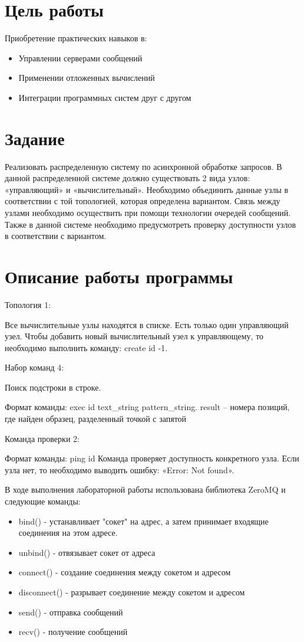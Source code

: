 \documentclass[a4paper, 12pt]{article}
\begin{document}
\section{Цель работы}
Приобретение практических навыков в:
\begin{itemize}
  \item Управлении серверами сообщений
  \item Применении отложенных вычислений
  \item Интеграции программных систем друг с другом
\end{itemize}

\section{Задание}
Реализовать распределенную систему по асинхронной обработке запросов. В данной распределенной системе должно существовать 2 вида узлов: «управляющий» и «вычислительный». Необходимо объединить данные узлы в соответствии с той топологией, которая определена вариантом. Связь между узлами необходимо осуществить при помощи технологии очередей сообщений. Также в данной системе необходимо предусмотреть проверку доступности узлов в соответствии с вариантом.

\section{Описание работы программы}
Топология 1:

Все вычислительные узлы находятся в списке. Есть только один управляющий узел. Чтобы
добавить новый вычислительный узел к управляющему, то необходимо выполнить команду:
create id -1.

Набор команд 4:

Поиск подстроки в строке. 

Формат команды: exec id text\_string pattern\_string.
result – номера позиций, где найден образец, разделенный точкой с запятой

Команда проверки 2:

Формат команды: ping id Команда проверяет доступность конкретного узла. Если узла нет, то необходимо выводить ошибку: «Error: Not found».

В ходе выполнения лабораторной работы использована библиотека ZeroMQ и следующие команды:
\begin{itemize}
  \item bind() - устанавливает "сокет" на адрес, а затем принимает входящие соединения на этом адресе.
  \item unbind() - отвязывает сокет от адреса
  \item connect() - создание соединения между сокетом и адресом
  \item disconnect() - разрывает соединение между сокетом и адресом
  \item send() - отправка сообщений
  \item recv() - получение сообщений
\end{itemize}
\end{document}
